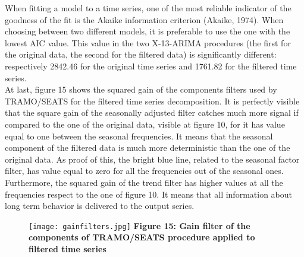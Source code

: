 \documentclass{article}
\begin{document}
When fitting a model to a time series, one of the most reliable indicator of the goodness of the fit is the Akaike information criterion (Akaike, 1974). When choosing between two different models, it is preferable to use the one with the lowest AIC value. This value in the two X-13-ARIMA procedures (the first for the original data, the second for the filtered data) is significantly different: respectively 2842.46 for the original time series and 1761.82 for the filtered time series.\\At last, figure 15 shows the squared gain of the components filters used by TRAMO/SEATS for the filtered time series decomposition. It is perfectly visible that the square gain of the seasonally adjusted filter catches much more signal if compared to the one of the original data, visible at figure 10, for it has value equal to one between the seasonal frequencies. It means that the seasonal component of the filtered data is much more deterministic than the one of the original data. As proof of this, the bright blue line, related to the seasonal factor filter, has value equal to zero for all the frequencies out of the seasonal ones. Furthermore, the squared gain of the trend filter has higher values at all the frequencies respect to the one of figure 10. It means that all information about long term behavior is delivered to the output series.
\begin{figure}[H]
  \texttt{[image: gainfilters.jpg]}
  {\textbf{\scriptsize Figure 15: Gain filter of the components of TRAMO/SEATS procedure applied to filtered time series}}
  \label{fig:1}
\end{figure}
\end{document}
